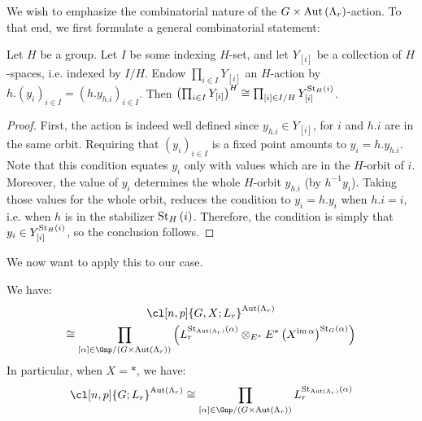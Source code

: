 We wish to emphasize the combinatorial nature of the $G \times \operatorname{Aut} \left(\Lambda_r\right)$-action.
To that end, we first formulate a general combinatorial statement:

\begin{proposition}\label{combinatorial-situation}
	Let $H$ be a group.
	Let $I$ be some indexing $H$-set, and let $Y_{\left[i\right]}$ be a collection of $H$-spaces, i.e. indexed by $I/H$.
	Endow $\prod_{i \in I} Y_{\left[i\right]}$ an $H$-action by
	$
	h.\left(y_i\right)_{i \in I}
	= \left(h.y_{h.i}\right)_{i \in I}
	$.
	Then
	$
	\left(\prod_{i \in I} Y_{\left[i\right]}\right)^H
	\cong \prod_{\left[i\right] \in I/H} Y_{\left[i\right]}^{\operatorname{St}_H\left(i\right)}
	$.
\end{proposition}

\begin{proof}
	First, the action is indeed well defined since $y_{h.i} \in Y_{\left[i\right]}$, for $i$ and $h.i$ are in the same orbit.
	Requiring that $\left(y_i\right)_{i \in I}$ is a fixed point amounts to $y_i = h.y_{h.i}$.
	Note that this condition equates $y_i$ only with values which are in the $H$-orbit of $i$.
	Moreover, the value of $y_i$ determines the whole $H$-orbit $y_{h.i}$ (by $h^{-1} y_i$).
	Taking those values for the whole orbit, reduces the condition to $y_i = h. y_i$ when $h.i = i$, i.e. when $h$ is in the stabilizer $\operatorname{St}_H\left(i\right)$.
	Therefore, the condition is simply that $y_i \in Y_{\left[i\right]}^{\operatorname{St}_H\left(i\right)}$, so the conclusion follows.
\end{proof}

We now want to apply this to our case.

\begin{proposition}\label{combinatorial-cl-fixed}
	We have:
	\begin{multline*}
		\cl[n,p]{G,X; L_r}^{\aut \left(\Lambda_r\right)}\\
		\cong \prod_{\left[\alpha\right] \in \Gnp/{\left(G \times \aut \left(\Lambda_r\right)\right)}}
		\left(
		L_r^{\stab_{\aut \left(\Lambda_r\right)}\left(\alpha\right)}
		\otimes_{E^*} E^*\left(X^{\im \alpha}\right)^{\stab_G\left(\alpha\right)}
		\right)
	\end{multline*}
	In particular, when $X = *$, we have:
	$$
	\cl[n,p]{G; L_r}^{\aut \left(\Lambda_r\right)}
	\cong \prod_{\left[\alpha\right] \in \Gnp/{\left(G \times \aut \left(\Lambda_r\right)\right)}}
	L_r^{\stab_{\aut \left(\Lambda_r\right)}\left(\alpha\right)}
	$$
\end{proposition}

